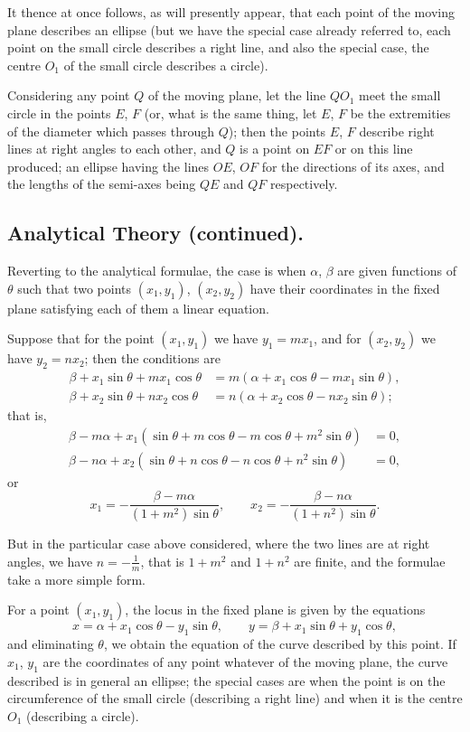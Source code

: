 \documentclass[12pt,a4paper]{article}
\theoremstyle{plain}
\begin{document}
It thence at once follows, as will presently appear, that each point of
the moving plane describes an ellipse (but we have the special case already
referred to, each point on the small circle describes a right line, and also
the special case, the centre $O_1$ of the small circle describes a circle).

Considering any point $Q$ of the moving plane, let the line $QO_1$ meet
the small circle in the points $E$, $F$ (or, what is the same thing, let $E$,
$F$ be the extremities of the diameter which passes through $Q$); then
the points $E$, $F$ describe right lines at right angles to each other, and
$Q$ is a point on $EF$ or on this line produced; an ellipse having the lines
$OE$, $OF$ for the directions of its axes, and the lengths of the semi-axes
being $QE$ and $QF$ respectively.

\newpage
\subsection*{Analytical Theory (continued).}

Reverting to the analytical formulae, the case is when $\alpha$, $\beta$ are
given functions of $\theta$ such that two points $(x_1,y_1)$, $(x_2,y_2)$ have
their coordinates in the fixed plane satisfying each of them a linear equation.

Suppose that for the point $(x_1,y_1)$ we have $y_1=mx_1$, and for
$(x_2,y_2)$ we have $y_2=nx_2$; then the conditions are
\begin{align*}
\beta + x_1\sin\theta + mx_1\cos\theta &= m(\alpha + x_1\cos\theta - mx_1\sin\theta),\\
\beta + x_2\sin\theta + nx_2\cos\theta &= n(\alpha + x_2\cos\theta - nx_2\sin\theta);
\end{align*}
that is,
\begin{align*}
\beta - m\alpha + x_1(\sin\theta+m\cos\theta-m\cos\theta+m^2\sin\theta) &= 0,\\
\beta - n\alpha + x_2(\sin\theta+n\cos\theta-n\cos\theta+n^2\sin\theta) &= 0,
\end{align*}
or
\[
x_1 = -\frac{\beta-m\alpha}{(1+m^2)\sin\theta},\qquad
x_2 = -\frac{\beta-n\alpha}{(1+n^2)\sin\theta}.
\]

But in the particular case above considered, where the two lines are at
right angles, we have $n=-\frac{1}{m}$, that is $1+m^2$ and $1+n^2$ are finite,
and the formulae take a more simple form.

For a point $(x_1,y_1)$, the locus in the fixed plane is given by the
equations
\[
x = \alpha+x_1\cos\theta-y_1\sin\theta,\qquad
y = \beta+x_1\sin\theta+y_1\cos\theta,
\]
and eliminating $\theta$, we obtain the equation of the curve described by this
point. If $x_1$, $y_1$ are the coordinates of any point whatever of the moving
plane, the curve described is in general an ellipse; the special cases are
when the point is on the circumference of the small circle (describing a right
line) and when it is the centre $O_1$ (describing a circle).
\end{document}
